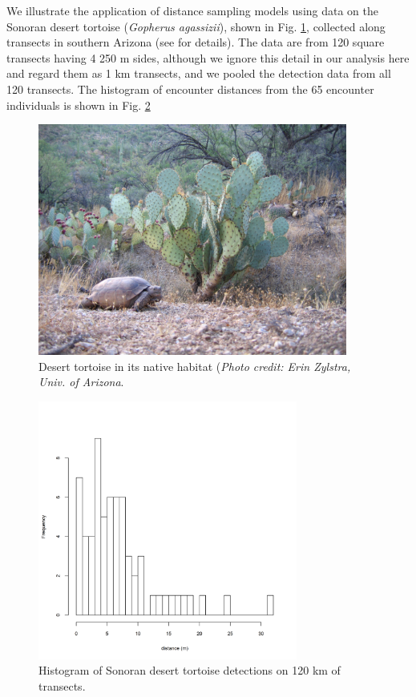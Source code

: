 We illustrate the application of distance sampling models using data
on the Sonoran desert tortoise ({\it Gopherus agassizii}), shown in
Fig. \ref{closed.fig.tortoise}, collected along transects
in southern Arizona (see \citet{zylstra_etal:2010} for
details). The data are from 120 square transects having 4 250 m sides,
 although we ignore this detail in our analysis here and regard
them as 1 km transects, and we pooled the detection data from all
120 transects. The histogram of encounter distances from the 65
encounter individuals is
shown in Fig. \ref{closed.fig.tortoisehist}
\begin{figure}
\centering
\includegraphics[height=3in,width=4in]{Ch3/figs/Erin_Zylstra_2.jpg}
\caption{Desert tortoise in its native habitat ({\it Photo credit: Erin
  Zylstra, Univ. of Arizona}.}
\label{closed.fig.tortoise}
\end{figure}

\begin{figure}
\centering
\includegraphics[height=3.35in,width=3.35in]{Ch3/figs/tortoise.png}
\caption{Histogram of Sonoran desert tortoise detections on 120 km of
transects.}
\label{closed.fig.tortoisehist}
\end{figure}

